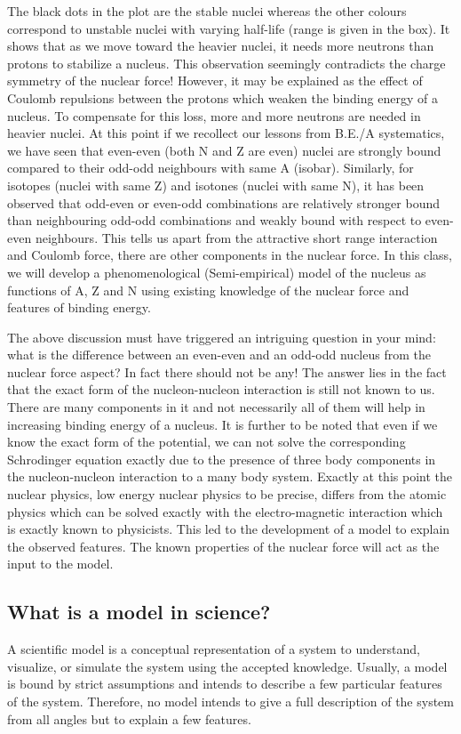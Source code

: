 \documentclass[ebook,12pt,oneside,openany]{memoir}
\begin{document}
\par The black dots in the plot are the stable nuclei whereas the other colours correspond to unstable nuclei with varying half-life (range is given in the box). It shows that as we move toward the heavier nuclei, it needs more neutrons than protons to stabilize a nucleus. This observation seemingly contradicts the charge symmetry of the nuclear force! However, it may be explained as the effect of Coulomb repulsions between the protons which weaken the binding energy of a nucleus. To compensate for this loss, more and more neutrons are needed in heavier nuclei. At this point if we recollect our lessons from B.E./A systematics, we have seen that even-even (both N and Z are even) nuclei are strongly bound compared to their odd-odd neighbours with same A (isobar). Similarly, for isotopes (nuclei with same Z) and isotones (nuclei with same N), it has been observed that odd-even or even-odd combinations are relatively stronger bound than neighbouring odd-odd combinations and weakly bound with respect to even-even neighbours. This tells us apart from the attractive short range interaction and Coulomb force, there are other components in the nuclear force. In this class, we will develop a phenomenological (Semi-empirical) model of the nucleus as functions of A, Z and N using existing knowledge of the nuclear force and features of binding energy.
\par The above discussion must have triggered an intriguing question in your mind: what is the difference between an even-even and an odd-odd nucleus from the nuclear force aspect? In fact there should not be any! The answer lies in the fact that the exact form of the nucleon-nucleon interaction is still not known to us. There are many components in it and not necessarily all of them will help in increasing binding energy of a nucleus. It is further to be noted that even if we know the exact form of the potential, we can not solve the corresponding Schrodinger equation exactly due to the presence of three body components in the nucleon-nucleon interaction to a many body system. Exactly at this point the nuclear physics, low energy nuclear physics to be precise, differs from the atomic physics which can be solved exactly with the electro-magnetic interaction which is exactly known to physicists. This led to the development of a model to explain the observed features. The known properties of the nuclear force will act as the input to the model.


    \subsection{What is a model in science?}
    A scientific model is a conceptual representation of a system to understand, visualize, or simulate the system using the accepted knowledge. Usually, a model is bound by strict assumptions and intends to describe a few particular features of the system. Therefore, no model intends to give a full description of the system from all angles but to explain a few features. 
\end{document}
